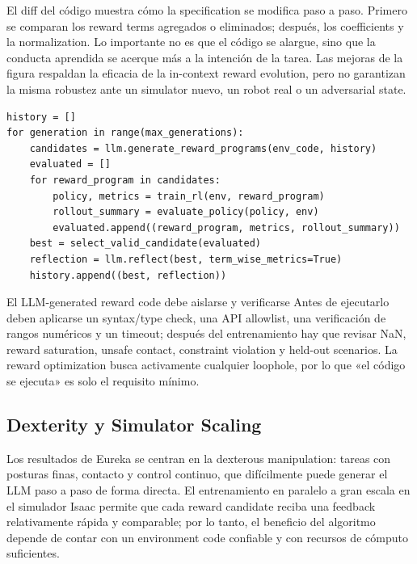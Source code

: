 
El diff del código muestra cómo la specification se modifica paso a paso. Primero se comparan los reward terms agregados o eliminados; después, los coefficients y la normalization. Lo importante no es que el código se alargue, sino que la conducta aprendida se acerque más a la intención de la tarea. Las mejoras de la figura respaldan la eficacia de la in-context reward evolution, pero no garantizan la misma robustez ante un simulator nuevo, un robot real o un adversarial state.

\begin{lstlisting}[caption={Pseudocódigo conceptual del ciclo externo de reward generation y el ciclo interno de entrenamiento con RL en Eureka}]
history = []
for generation in range(max_generations):
    candidates = llm.generate_reward_programs(env_code, history)
    evaluated = []
    for reward_program in candidates:
        policy, metrics = train_rl(env, reward_program)
        rollout_summary = evaluate_policy(policy, env)
        evaluated.append((reward_program, metrics, rollout_summary))
    best = select_valid_candidate(evaluated)
    reflection = llm.reflect(best, term_wise_metrics=True)
    history.append((best, reflection))
\end{lstlisting}

\begin{warningbox}{El LLM-generated reward code debe aislarse y verificarse}
Antes de ejecutarlo deben aplicarse un syntax/type check, una API allowlist, una verificación de rangos numéricos y un timeout; después del entrenamiento hay que revisar NaN, reward saturation, unsafe contact, constraint violation y held-out scenarios. La reward optimization busca activamente cualquier loophole, por lo que «el código se ejecuta» es solo el requisito mínimo.
\end{warningbox}

\subsection{Dexterity y Simulator Scaling}

Los resultados de Eureka se centran en la dexterous manipulation: tareas con posturas finas, contacto y control continuo, que difícilmente puede generar el LLM paso a paso de forma directa. El entrenamiento en paralelo a gran escala en el simulador Isaac permite que cada reward candidate reciba una feedback relativamente rápida y comparable; por lo tanto, el beneficio del algoritmo depende de contar con un environment code confiable y con recursos de cómputo suficientes.

